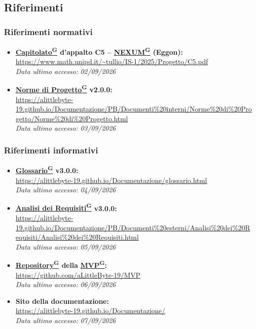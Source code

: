 \documentclass[a4paper,12pt]{article}
\providecommand{\glslink}[2]{\href{https://alittlebyte-19.github.io/Documentazione/glossario.html\#gls-#1}{\underline{#2}\textsuperscript{\scriptsize G}}}
\begin{document}
\subsection{Riferimenti}

\subsubsection{Riferimenti normativi}

\begin{itemize}
    \item \textbf{\glslink{capitolato}{Capitolato} d'appalto C5 -- \glslink{nexum}{NEXUM} (Eggon):}\\
    \url{https://www.math.unipd.it/~tullio/IS-1/2025/Progetto/C5.pdf}\\
    \textit{Data ultimo accesso: 02/09/2026}
    \item \textbf{\glslink{norme-di-progetto}{Norme di Progetto} v2.0.0:}\\
    \url{https://alittlebyte-19.github.io/Documentazione/PB/Documenti\%20interni/Norme\%20di\%20Progetto/Norme\%20di\%20Progetto.html}\\
    \textit{Data ultimo accesso: 03/09/2026}
\end{itemize}

\subsubsection{Riferimenti informativi}

\begin{itemize}
    \item \textbf{\glslink{glossario}{Glossario} v3.0.0:}\\
    \url{https://alittlebyte-19.github.io/Documentazione/glossario.html}\\
    \textit{Data ultimo accesso: 04/09/2026}
    \item \textbf{\glslink{analisi-dei-requisiti-adr}{Analisi dei Requisiti} v3.0.0:}\\
    \url{https://alittlebyte-19.github.io/Documentazione/PB/Documenti\%20esterni/Analisi\%20dei\%20Requisiti/Analisi\%20dei\%20Requisiti.html}\\
    \textit{Data ultimo accesso: 05/09/2026}
    \item \textbf{\glslink{repository}{Repository} della \glslink{mvp-minimum-viable-product}{MVP}:}\\
    \url{https://github.com/aLittleByte-19/MVP}\\
    \textit{Data ultimo accesso: 06/09/2026}
    \item \textbf{Sito della documentazione:}\\
    \url{https://alittlebyte-19.github.io/Documentazione/}\\
    \textit{Data ultimo accesso: 07/09/2026}
\end{itemize}
\end{document}
